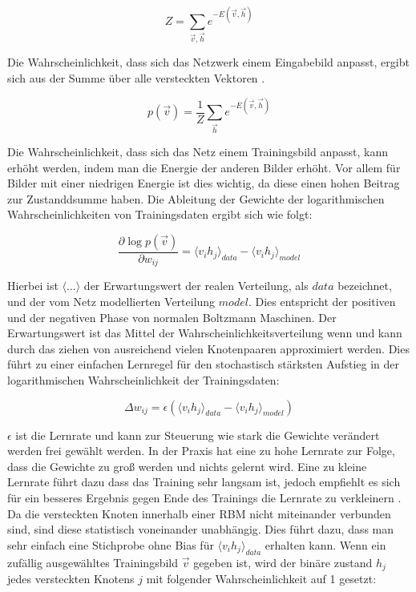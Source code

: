 \documentclass[12pt]{article}
\begin{document}
\begin{equation}
Z=\sum_{\vec{v},\vec{h}} e^{-E(\vec{v},\vec{h})}
\end{equation}

Die Wahrscheinlichkeit, dass sich das Netzwerk einem Eingabebild anpasst, ergibt sich aus der Summe über alle versteckten Vektoren \cite{guide}.

\begin{equation}
p(\vec{v})= \frac{1}{Z} \sum_{\vec{h}} e^{-E(\vec{v},\vec{h})}
\end{equation}

Die Wahrscheinlichkeit, dass sich das Netz einem Trainingsbild anpasst, kann erhöht werden, indem man die Energie der anderen Bilder erhöht. Vor allem für Bilder mit einer niedrigen Energie ist dies wichtig, da diese einen hohen Beitrag zur Zustanddsumme haben. Die Ableitung der Gewichte der logarithmischen Wahrscheinlichkeiten von Trainingsdaten ergibt sich wie folgt:

\begin{equation}
\frac{\partial \log p(\vec{v})}{\partial w_{ij}} = \langle v_ih_j \rangle_{data} - \langle v_i h_j \rangle_{model}
\end{equation}

Hierbei ist $\langle...\rangle$ der Erwartungswert der realen Verteilung, als $data$ bezeichnet, und der vom Netz modellierten Verteilung $model$. Dies entspricht der positiven und der negativen Phase von normalen Boltzmann Maschinen. Der Erwartungswert ist das Mittel der Wahrscheinlichkeitsverteilung wenn und kann durch das ziehen von ausreichend vielen Knotenpaaren approximiert werden. Dies führt zu einer einfachen Lernregel für den stochastisch stärksten Aufstieg in der logarithmischen Wahrscheinlichkeit der Trainingsdaten:

\begin{equation}
\Delta w_{ij} = \epsilon\left( \langle v_i h_j \rangle_{data} - \langle v_i h_j \rangle_{model} \right)
\end{equation}

$\epsilon$ ist die Lernrate und kann zur Steuerung wie stark die Gewichte verändert werden frei gewählt werden. In der Praxis hat eine zu hohe Lernrate zur Folge, dass die Gewichte zu groß werden und nichts gelernt wird. Eine zu kleine Lernrate führt dazu dass das Training sehr langsam ist, jedoch empfiehlt es sich für ein besseres Ergebnis gegen Ende des Trainings die Lernrate zu verkleinern \cite{Guide}. Da die versteckten Knoten innerhalb einer RBM nicht miteinander verbunden sind, sind diese statistisch voneinander unabhängig. Dies führt dazu, dass man sehr einfach eine Stichprobe ohne Bias für $\langle v_i h_j \rangle_{data}$ erhalten kann. Wenn ein zufällig ausgewähltes Trainingsbild $\vec{v}$ gegeben ist, wird der binäre zustand $h_j$ jedes versteckten Knotens $j$ mit folgender Wahrscheinlichkeit auf 1 gesetzt:
\end{document}

